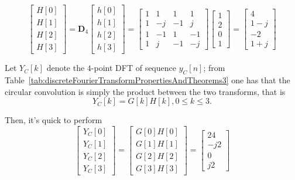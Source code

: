 \documentclass[\documentfontsize, twocolumn]{\classname}
\begin{document}
\begin{equation*}
    \begin{bmatrix} H[0] \\ H[1] \\ H[2] \\ H[3] \end{bmatrix}
        =
        \bm{D}_4
        \begin{bmatrix} h[0] \\ h[1] \\ h[2] \\ h[3] \end{bmatrix}
        =
        \begin{bmatrix}
            1 & 1 & 1 & 1 \\
            1 & -j & -1 & j \\
            1 & -1 & 1 & -1 \\
            1 & j & -1 & -j
        \end{bmatrix}
        \begin{bmatrix} 1 \\ 2 \\ 0 \\ 1 \end{bmatrix}
        =
        \begin{bmatrix}
            4 \\
            1 - j \\
            -2 \\
            1 + j
        \end{bmatrix}
\end{equation*}

Let $Y_C[k]$ denote the $4$-point DFT of sequence $y_C[n]$; from Table~\ref{tab:discreteFourierTransformPropertiesAndTheorems3} one has that the circular convolution is simply the product between the two transforms, that is
\[
    Y_C[k] = G[k]H[k], 0 \leq k \leq 3.
\]

Then, it's quick to perform
\begin{equation*}
    \begin{bmatrix}
        Y_C[0] \\
        Y_C[1] \\
        Y_C[2] \\
        Y_C[3]
    \end{bmatrix}
    =
    \begin{bmatrix}
        G[0]H[0] \\
        G[1]H[1] \\
        G[2]H[2] \\
        G[3]H[3]
    \end{bmatrix}
    =
    \begin{bmatrix}
        24 \\
        -j2 \\
        0 \\
        j2
    \end{bmatrix}
\end{equation*}
\end{document}
